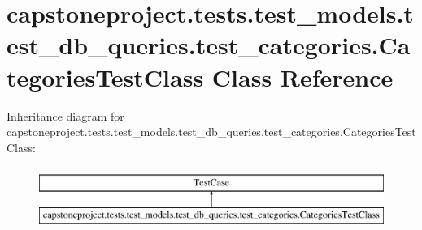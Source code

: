 \hypertarget{classcapstoneproject_1_1tests_1_1test__models_1_1test__db__queries_1_1test__categories_1_1_categories_test_class}{}\section{capstoneproject.\+tests.\+test\+\_\+models.\+test\+\_\+db\+\_\+queries.\+test\+\_\+categories.\+Categories\+Test\+Class Class Reference}
\label{classcapstoneproject_1_1tests_1_1test__models_1_1test__db__queries_1_1test__categories_1_1_categories_test_class}
Inheritance diagram for capstoneproject.\+tests.\+test\+\_\+models.\+test\+\_\+db\+\_\+queries.\+test\+\_\+categories.\+Categories\+Test\+Class\+:\begin{figure}[H]
\begin{center}
\leavevmode
\includegraphics[height=2.000000cm]{classcapstoneproject_1_1tests_1_1test__models_1_1test__db__queries_1_1test__categories_1_1_categories_test_class}
\end{center}
\end{figure}
